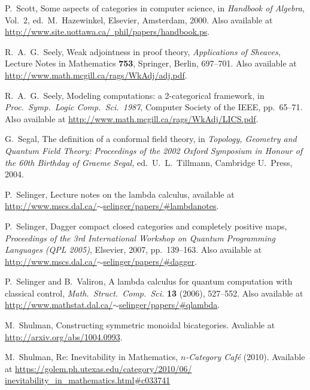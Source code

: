 \documentclass[12pt,twoside,openright]{report}
\begin{document}
\begin{thebibliography}{99}
 P.\ Scott, Some aspects of categories in computer science, in {\sl Handbook of Algebra}, Vol.\ 2, ed.\ M.\ Hazewinkel, Elsevier, Amsterdam, 2000. Also available at \\
\href{http://www.site.uottawa.ca/~phil/papers/handbook.ps}
{http://www.site.uottawa.ca/~phil/papers/handbook.ps}.

 R.\ A.\ G.\ Seely, Weak adjointness in proof theory,
{\sl Applications of Sheaves}, Lecture Notes in Mathematics {\bf 753}, Springer, Berlin, 697--701.  Also available at \hfill \break
\href{http://www.math.mcgill.ca/rags/WkAdj/adj.pdf}
{http://www.math.mcgill.ca/rags/WkAdj/adj.pdf}.

R.\ A.\ G.\ Seely, Modeling computations: a
2-categorical framework, in {\sl Proc.\ Symp.\ Logic Comp.\ 
Sci.\ 1987}, Computer Society of the IEEE, pp.\ 65--71. Also available at \hfill \break 
\href{http://www.math.mcgill.ca/rags/WkAdj/LICS.pdf}
{http://www.math.mcgill.ca/rags/WkAdj/LICS.pdf}.

 G.\ Segal, The definition of a conformal field theory, in {\sl Topology, Geometry and Quantum Field Theory: Proceedings of the 
2002 Oxford Symposium in Honour of the 60th Birthday of Graeme Segal,} 
ed.\ U.\ L.\ Tillmann, Cambridge U.\ Press, 2004.

 P.\ Selinger, Lecture notes on the lambda calculus, available at \hfill \break
\href{http://www.mscs.dal.ca/~selinger/papers/#lambdanotes}
{http://www.mscs.dal.ca/$\sim$selinger/papers/\#lambdanotes}.

 P.\ Selinger, Dagger compact closed categories and completely positive maps, {\sl Proceedings of the 3rd International Workshop on Quantum Programming Languages (QPL 2005)}, Elsevier, 2007, pp.\ 139--163. Also available at \href{http://www.mscs.dal.ca/~selinger/papers/#dagger}
{http://www.mscs.dal.ca/$\sim$selinger/papers/\#dagger}.

 P.\ Selinger and B.\ Valiron, A lambda calculus for quantum computation with classical control,
{\sl Math.\ Struct.\ Comp.\ Sci.} {\bf 13} (2006), 527--552. Also available at \hfill \break 
\href{http://www.mathstat.dal.ca/~selinger/papers/#qlambda}
{http://www.mathstat.dal.ca/$\sim$selinger/papers/\#qlambda}.

 M.\ Shulman, Constructing symmetric monoidal bicategories.  Avaliable at \href{http://arxiv.org/abs/1004.0993}{http://arxiv.org/abs/1004.0993}.

 M.\ Shulman, Re: Inevitability in Mathematics,
{\sl $n$-Category Caf\'e} (2010).  Available at
\href{https://golem.ph.utexas.edu/category/2010/06/inevitability_in_mathematics.html#c033741}
{https://golem.ph.utexas.edu/category/2010/06/}\\
\href{https://golem.ph.utexas.edu/category/2010/06/inevitability_in_mathematics.html#c033741}
{inevitability\_in\_mathematics.html\#c033741}


\end{thebibliography}
\end{document}
